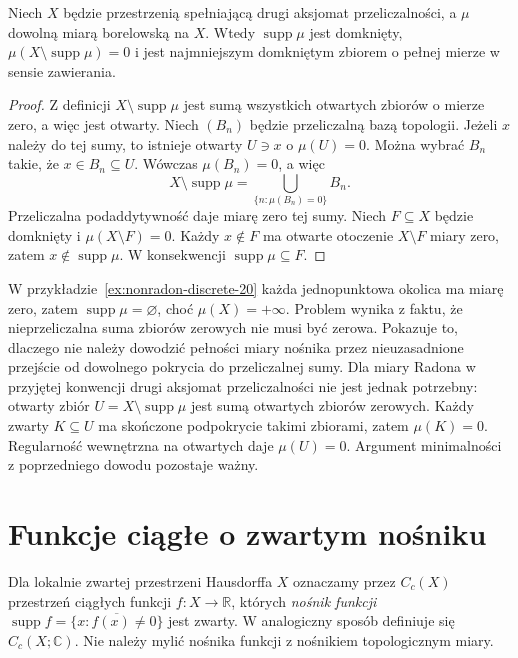 \begin{twierdzenie}
\label{thm:support-fullmass-20}
Niech $X$ będzie przestrzenią spełniającą drugi aksjomat przeliczalności,
a $\mu$ dowolną miarą borelowską na $X$. Wtedy
$\operatorname{supp}\mu$ jest domknięty,
$\mu(X\setminus\operatorname{supp}\mu)=0$ i jest
najmniejszym domkniętym zbiorem o pełnej mierze
w sensie zawierania.
\end{twierdzenie}
\begin{proof}
Z definicji
$X\setminus\operatorname{supp}\mu$
jest sumą wszystkich otwartych zbiorów o mierze zero,
a więc jest otwarty. Niech $(B_n)$ będzie przeliczalną
bazą topologii. Jeżeli $x$ należy do tej sumy, to
istnieje otwarty $U\ni x$ o $\mu(U)=0$.
Można wybrać $B_n$ takie, że $x\in B_n\subseteq U$.
Wówczas $\mu(B_n)=0$, a więc
\[
X\setminus\operatorname{supp}\mu
=\bigcup_{\{n:\mu(B_n)=0\}}B_n.
\]
Przeliczalna podaddytywność daje miarę zero tej sumy.
Niech $F\subseteq X$ będzie domknięty i
$\mu(X\setminus F)=0$. Każdy $x\notin F$ ma
otwarte otoczenie $X\setminus F$ miary zero,
zatem $x\notin\operatorname{supp}\mu$.
W konsekwencji $\operatorname{supp}\mu\subseteq F$.
\end{proof}

\begin{uwaga}
W przykładzie~\ref{ex:nonradon-discrete-20} każda
jednopunktowa okolica ma miarę zero, zatem
$\operatorname{supp}\mu=\varnothing$, choć
$\mu(X)=+\infty$. Problem wynika z faktu, że
nieprzeliczalna suma zbiorów zerowych nie musi być
zerowa. Pokazuje to, dlaczego nie należy dowodzić
pełności miary nośnika przez nieuzasadnione przejście
od dowolnego pokrycia do przeliczalnej sumy.
Dla miary Radona w przyjętej konwencji drugi aksjomat
przeliczalności nie jest jednak potrzebny: otwarty zbiór
$U=X\setminus\operatorname{supp}\mu$ jest sumą otwartych
zbiorów zerowych. Każdy zwarty $K\subseteq U$ ma skończone
podpokrycie takimi zbiorami, zatem $\mu(K)=0$.
Regularność wewnętrzna na otwartych daje $\mu(U)=0$.
Argument minimalności z poprzedniego dowodu pozostaje ważny.
\end{uwaga}

\section{Funkcje ciągłe o zwartym nośniku}
Dla lokalnie zwartej przestrzeni Hausdorffa $X$ oznaczamy
przez $C_c(X)$ przestrzeń ciągłych funkcji
$f:X\to\mathbb R$, których \emph{nośnik funkcji}
$\operatorname{supp}f=\overline{\{x:f(x)\neq0\}}$
jest zwarty. W analogiczny sposób definiuje się
$C_c(X;\mathbb C)$. Nie należy mylić nośnika funkcji
z nośnikiem topologicznym miary.

